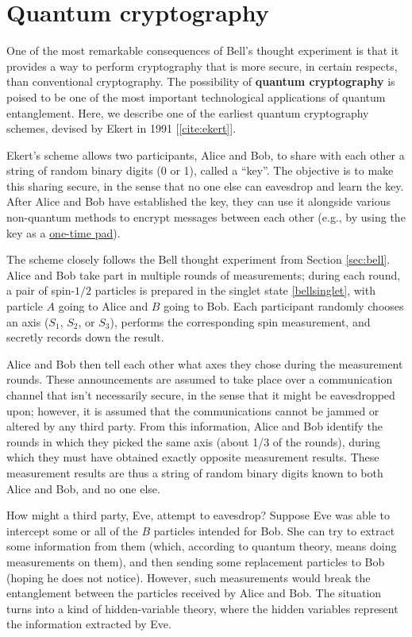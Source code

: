 \documentclass[pra,12pt]{revtex4-2}
\begin{document}
\section{Quantum cryptography}

One of the most remarkable consequences of Bell's thought experiment
is that it provides a way to perform cryptography that is more secure,
in certain respects, than conventional cryptography.  The possibility
of \textbf{quantum cryptography} is poised to be one of the most
important technological applications of quantum entanglement.  Here,
we describe one of the earliest quantum cryptography schemes, devised
by Ekert in 1991 [\ref{cite:ekert}].

Ekert's scheme allows two participants, Alice and Bob, to share with
each other a string of random binary digits (0 or 1), called a
``key''.  The objective is to make this sharing secure, in the sense
that no one else can eavesdrop and learn the key.  After Alice and Bob
have established the key, they can use it alongside various
non-quantum methods to encrypt messages between each other (e.g., by using the key as a
\href{https://en.wikipedia.org/wiki/One-time_pad}{one-time pad}).

The scheme closely follows the Bell thought experiment from Section
\ref{sec:bell}.  Alice and Bob take part in multiple rounds of
measurements; during each round, a pair of spin-$1/2$ particles is
prepared in the singlet state \eqref{bellsinglet}, with particle $A$
going to Alice and $B$ going to Bob.  Each participant randomly
chooses an axis ($S_1$, $S_2$, or $S_3$), performs the corresponding
spin measurement, and secretly records down the result.

Alice and Bob then tell each other what axes they chose during the
measurement rounds.  These announcements are assumed to take place
over a communication channel that isn't necessarily secure, in the
sense that it might be eavesdropped upon; however, it is assumed that
the communications cannot be jammed or altered by any third party.
From this information, Alice and Bob identify the rounds in which they
picked the same axis (about 1/3 of the rounds), during which they must
have obtained exactly opposite measurement results.  These measurement
results are thus a string of random binary digits known to both Alice
and Bob, and no one else.

How might a third party, Eve, attempt to eavesdrop?  Suppose Eve was
able to intercept some or all of the $B$ particles intended for Bob.
She can try to extract some information from them (which, according to
quantum theory, means doing measurements on them), and then sending
some replacement particles to Bob (hoping he does not notice).
However, such measurements would break the entanglement between the
particles received by Alice and Bob.  The situation turns into a kind
of hidden-variable theory, where the hidden variables represent the
information extracted by Eve.
\end{document}
